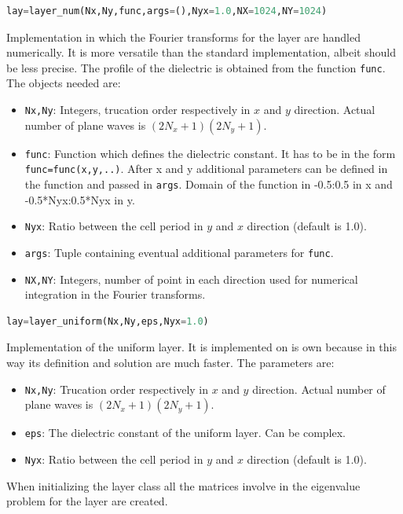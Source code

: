 \documentclass[a4paper,10pt]{report}
\begin{document}
\begin{lstlisting}[language=Python]
lay=layer_num(Nx,Ny,func,args=(),Nyx=1.0,NX=1024,NY=1024)
\end{lstlisting}
Implementation in which the Fourier transforms for the layer are handled numerically. It is more versatile than the standard implementation, albeit should be less precise. The profile of the dielectric is obtained from the function \texttt{func}. The objects needed are:
\begin{itemize}[noitemsep,topsep=0pt,parsep=0pt,partopsep=0pt]
\item \texttt{Nx,Ny}: Integers, trucation order respectively in $x$ and $y$ direction. Actual number of plane waves is $(2N_x+1)(2N_y+1)$.
\item \texttt{func}: Function which defines the dielectric constant. It has to be in the form \texttt{func=func(x,y,..)}. After x and y additional parameters can be defined in the function and passed in \texttt{args}. Domain of the function in -0.5:0.5 in x and -0.5*Nyx:0.5*Nyx in y. 
\item \texttt{Nyx}: Ratio between the cell period in $y$ and $x$ direction (default is 1.0).
\item \texttt{args}: Tuple containing eventual additional parameters for \texttt{func}.
\item \texttt{NX,NY}: Integers, number of point in each direction used for numerical integration in the Fourier transforms.
\end{itemize}

\begin{lstlisting}[language=Python]
lay=layer_uniform(Nx,Ny,eps,Nyx=1.0)
\end{lstlisting}
Implementation of the uniform layer. It is implemented on is own because in this way its definition and solution are much faster. The parameters are:
\begin{itemize}[noitemsep,topsep=0pt,parsep=0pt,partopsep=0pt]
\item \texttt{Nx,Ny}: Trucation order respectively in $x$ and $y$ direction. Actual number of plane waves is $(2N_x+1)(2N_y+1)$.
\item \texttt{eps}: The dielectric constant of the uniform layer. Can be complex. 
\item \texttt{Nyx}: Ratio between the cell period in $y$ and $x$ direction (default is 1.0).
\end{itemize}
 


When initializing the layer class all the matrices involve in the eigenvalue problem for the layer are created.
\end{document}
